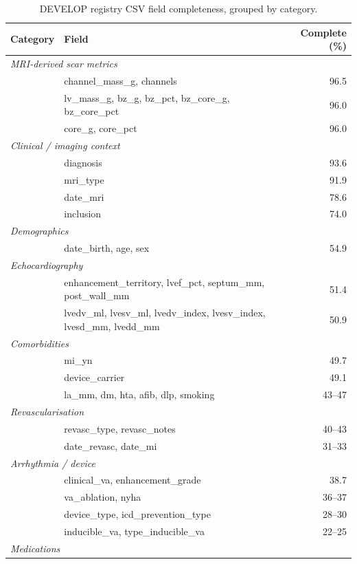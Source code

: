 \begin{table}[htbp]
\centering
\caption{DEVELOP registry CSV field completeness, grouped by category.}
\label{tab:clinicalcsv}
\footnotesize
\begin{tabular}{llr}
\toprule
Category & Field & Complete (\%) \\
\midrule
\multicolumn{3}{l}{\textit{MRI-derived scar metrics}} \\
& channel\_mass\_g, channels & 96.5 \\
& lv\_mass\_g, bz\_g, bz\_pct, bz\_core\_g, bz\_core\_pct & 96.0 \\
& core\_g, core\_pct & 96.0 \\
\midrule
\multicolumn{3}{l}{\textit{Clinical / imaging context}} \\
& diagnosis & 93.6 \\
& mri\_type & 91.9 \\
& date\_mri & 78.6 \\
& inclusion & 74.0 \\
\midrule
\multicolumn{3}{l}{\textit{Demographics}} \\
& date\_birth, age, sex & 54.9 \\
\midrule
\multicolumn{3}{l}{\textit{Echocardiography}} \\
& enhancement\_territory, lvef\_pct, septum\_mm, post\_wall\_mm & 51.4 \\
& lvedv\_ml, lvesv\_ml, lvedv\_index, lvesv\_index, lvesd\_mm, lvedd\_mm & 50.9 \\
\midrule
\multicolumn{3}{l}{\textit{Comorbidities}} \\
& mi\_yn & 49.7 \\
& device\_carrier & 49.1 \\
& la\_mm, dm, hta, afib, dlp, smoking & 43--47 \\
\midrule
\multicolumn{3}{l}{\textit{Revascularisation}} \\
& revasc\_type, revasc\_notes & 40--43 \\
& date\_revasc, date\_mi & 31--33 \\
\midrule
\multicolumn{3}{l}{\textit{Arrhythmia / device}} \\
& clinical\_va, enhancement\_grade & 38.7 \\
& va\_ablation, nyha & 36--37 \\
& device\_type, icd\_prevention\_type & 28--30 \\
& inducible\_va, type\_inducible\_va & 22--25 \\
\midrule
\multicolumn{3}{l}{\textit{Medications}} \\

\end{tabular}
\end{table}
